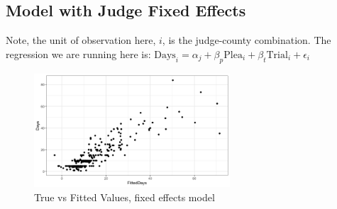 \documentclass[11pt]{article}
\begin{document}
  \subsection{Model with Judge Fixed Effects}
    Note, the unit of observation here, $i$, is the judge-county combination. The regression we are running here is:  $\text{Days}_i = \alpha_j + \beta_p \text{Plea}_i + \beta_t \text{Trial}_i + \epsilon_i$

    \begin{figure}[H]
      \centering
      \includegraphics[width=0.65\textwidth]{../../../output/figures/Exploration/fit_fixed_JudgeID}
      \caption{True vs Fitted Values, fixed effects model}
    \end{figure}
\end{document}
